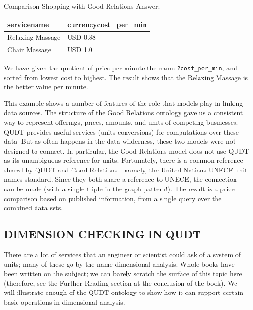 \begin{challenge}{Comparison Shopping with Good Relations}
Answer:

\begin{tabular}{|ll|}
\hline
servicename&currencycost\_per\_min\\
\hline
Relaxing Massage&USD 0.88\\
Chair Massage&USD 1.0\\
\hline
\end{tabular}

We have given the quotient of price per minute the name \texttt{?cost\_per\_min},
and sorted from lowest cost to highest. The result shows that the
Relaxing Massage is the better value per minute.
\end{challenge}

This example shows a number of features of the role that models play in
linking data sources. The structure of the Good Relations ontology gave
us a consistent way to represent offerings, prices, amounts, and units
of competing businesses. QUDT provides useful services (units
conversions) for computations over these data. But as often happens in
the data wilderness, these two models were not designed to connect. In
particular, the Good Relations model does not use QUDT as its
unambiguous reference for units. Fortunately, there is a common
reference shared by QUDT and Good Relations---namely, the United Nations
UNECE unit names standard. Since they both share a reference to UNECE,
the connection can be made (with a single triple in the graph pattern!).
The result is a price comparison based on published information, from a
single query over the combined data sets.

\subsection{DIMENSION CHECKING IN QUDT}

There are a lot of services that an engineer or scientist could ask of a
system of units; many of these go by the name dimensional analysis.
Whole books have been written on the subject; we can barely scratch the
surface of this topic here (therefore, see the Further Reading section
at the conclusion of the book). We will illustrate enough of the QUDT
ontology to show how it can support certain basic operations in
dimensional analysis.

